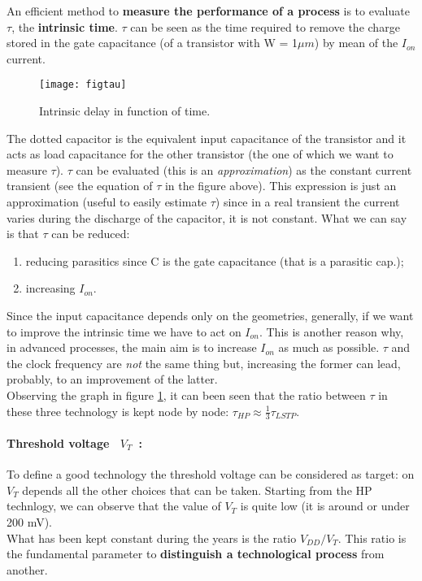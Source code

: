 \documentclass[a4paper, 12pt, twoside, openright]{report}
\begin{document}
An efficient method to \textbf{measure the performance of a process} is to evaluate $\tau$, the \textbf{intrinsic time}. $\tau$ can be seen as the time required to remove the charge stored in the gate capacitance (of a transistor with W = 1$\mu m$) by mean of the $I_{on}$ current.

	\begin{figure}[h]
	\centering
	\texttt{[image: figtau]}
	\caption{Intrinsic delay in function of time.}
	\label{tau}
	\end{figure}

The dotted capacitor is the equivalent input capacitance of the transistor and it acts as load capacitance for the other transistor (the one of which we want to measure $\tau$). $\tau$ can be evaluated (this is an \emph{approximation}) as the constant current transient (see the equation of $\tau$ in the figure above). This expression is just an approximation (useful to easily estimate $\tau$) since in a real transient the current varies during the discharge of the capacitor, it is not constant. What we can say is that $\tau$ can be reduced:

	\begin{enumerate}
		\item reducing parasitics since C is the gate capacitance (that is a parasitic cap.);
		\item increasing $I_{on}$.
	\end{enumerate}

Since the input capacitance depends only on the geometries, generally, if we want to improve the intrinsic time we have to act on $I_{on}$. This is another reason why, in advanced processes, the main aim is to increase $I_{on}$ as much as possible. $\tau$ and the clock frequency are \emph{not} the same thing but, increasing the former can lead, probably, to an improvement of the latter.\\
Observing the graph in figure \ref{tau}, it can been seen that the ratio between $\tau$ in these three technology is kept node by node: $\tau_{HP} \approx \frac{1}{3} \tau_{LSTP}$.


\paragraph{Threshold voltage~  $V_{T}$~:} To define a good technology the threshold voltage can be considered as target: on $V_{T}$ depends all the other choices that can be taken. Starting from the HP technlogy, we can observe that the value of $V_{T}$ is quite low (it is around or under 200 mV).\\
What has been kept constant during the years is the ratio $V_{DD}/V_{T}$. This ratio is the fundamental parameter to \textbf{distinguish a technological process} from another.
\end{document}

